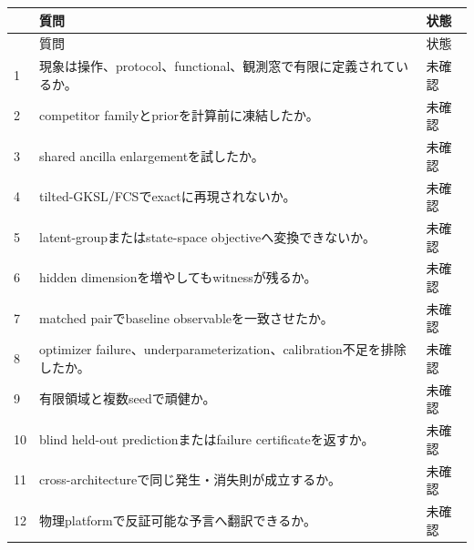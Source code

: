 \documentclass[11pt,a4paper,uplatex,dvipdfmx]{bxjsarticle}
\theoremstyle{remark}
\begin{document}
\begin{longtable}{p{0.45cm}p{10.2cm}p{1.55cm}}
\toprule
 & 質問 & 状態 \\
\midrule
\endfirsthead
\toprule
 & 質問 & 状態 \\
\midrule
\endhead
1 & 現象は操作、protocol、functional、観測窓で有限に定義されているか。 & 未確認 \\
2 & competitor familyとpriorを計算前に凍結したか。 & 未確認 \\
3 & shared ancilla enlargementを試したか。 & 未確認 \\
4 & tilted-GKSL/FCSでexactに再現されないか。 & 未確認 \\
5 & latent-groupまたはstate-space objectiveへ変換できないか。 & 未確認 \\
6 & hidden dimensionを増やしてもwitnessが残るか。 & 未確認 \\
7 & matched pairでbaseline observableを一致させたか。 & 未確認 \\
8 & optimizer failure、underparameterization、calibration不足を排除したか。 & 未確認 \\
9 & 有限領域と複数seedで頑健か。 & 未確認 \\
10 & blind held-out predictionまたはfailure certificateを返すか。 & 未確認 \\
11 & cross-architectureで同じ発生・消失則が成立するか。 & 未確認 \\
12 & 物理platformで反証可能な予言へ翻訳できるか。 & 未確認 \\
\bottomrule
\end{longtable}
\end{document}
